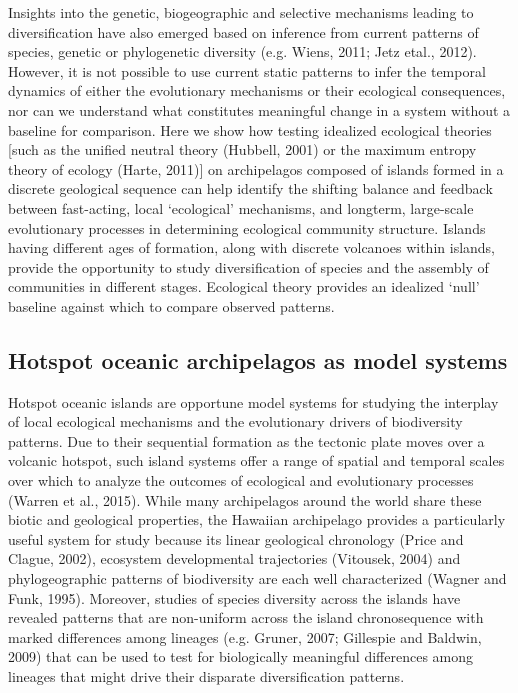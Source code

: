 Insights into the genetic, biogeographic and selective mechanisms
leading to diversification have also emerged based on inference from
current patterns of species, genetic or phylogenetic diversity
(e.g. Wiens, 2011; Jetz etal., 2012). However, it is not possible to
use current static patterns to infer the temporal dynamics of either
the evolutionary mechanisms or their ecological consequences, nor can
we understand what constitutes meaningful change in a system without a
baseline for comparison. Here we show how testing idealized ecological
theories [such as the unified neutral theory (Hubbell, 2001) or the
maximum entropy theory of ecology (Harte, 2011)] on archipelagos
composed of islands formed in a discrete geological sequence can help
identify the shifting balance and feedback between fast-acting, local
‘ecological’ mechanisms, and longterm, large-scale evolutionary
processes in determining ecological community structure. Islands
having different ages of formation, along with discrete volcanoes
within islands, provide the opportunity to study diversification of
species and the assembly of communities in different
stages. Ecological theory provides an idealized ‘null’ baseline
against which to compare observed patterns.


\subsection{Hotspot oceanic archipelagos as model systems}

Hotspot oceanic islands are opportune model systems for studying the
interplay of local ecological mechanisms and the evolutionary drivers
of biodiversity patterns. Due to their sequential formation as the
tectonic plate moves over a volcanic hotspot, such island systems
offer a range of spatial and temporal scales over which to analyze the
outcomes of ecological and evolutionary processes (Warren et al.,
2015). While many archipelagos around the world share these biotic and
geological properties, the Hawaiian archipelago provides a
particularly useful system for study because its linear geological
chronology (Price and Clague, 2002), ecosystem developmental
trajectories (Vitousek, 2004) and phylogeographic patterns of
biodiversity are each well characterized (Wagner and Funk,
1995). Moreover, studies of species diversity across the islands have
revealed patterns that are non-uniform across the island
chronosequence with marked differences among lineages (e.g. Gruner,
2007; Gillespie and Baldwin, 2009) that can be used to test for
biologically meaningful differences among lineages that might drive
their disparate diversification patterns.


